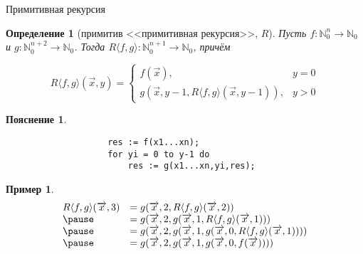 \documentclass[aspectratio=169]{beamer}
\newtheorem{dfn}{Определение}[section]
\newtheorem{exm}{Пример}[section]
\newtheorem{snote}{Пояснение}[section]
\begin{document}
\begin{frame}[fragile]{Примитивная рекурсия}
\begin{dfn}[примитив <<примитивная рекурсия>>, $R$]
Пусть $f: \mathbb{N}^n_0\to\mathbb{N}_0$ и $g: \mathbb{N}^{n+2}_0 \to\mathbb{N}_0$.
Тогда $R\langle f,g\rangle: \mathbb{N}^{n+1}_0\to\mathbb{N}_0$, причём

$$R\langle f,g\rangle(\overrightarrow{x},y)=
 \left\{\begin{array}{ll} 
  f(\overrightarrow{x}), &y=0\\
  g(\overrightarrow{x},y-1,R\langle f,g\rangle (\overrightarrow{x},y-1)), &y > 0
\end{array}\right.$$
\end{dfn}\pause

\vspace{-0.3cm}
\begin{snote}\vspace{-0.5cm}
\begin{verbatim}
                    res := f(x1...xn);
                    for yi = 0 to y-1 do
                        res := g(x1...xn,yi,res);
\end{verbatim}
\end{snote}\pause

\vspace{-0.3cm}
\begin{exm}\vspace{-0.5cm}
$$\begin{array}{ll}
    R\langle f,g\rangle(\overrightarrow{x},3) &= g(\overrightarrow{x},2,R\langle f,g\rangle(\overrightarrow{x},2)) \\\pause
 &=   g(\overrightarrow{x},2,g(\overrightarrow{x},1,R\langle f,g\rangle(\overrightarrow{x},1))) \\\pause
 &=   g(\overrightarrow{x},2,g(\overrightarrow{x},1,g(\overrightarrow{x},0,R\langle f,g\rangle(\overrightarrow{x},1)))) \\\pause
 &=  g(\overrightarrow{x},2,g(\overrightarrow{x},1,g(\overrightarrow{x},0,f(\overrightarrow{x}))))
\end{array}$$
\end{exm}


\end{frame}
\end{document}
